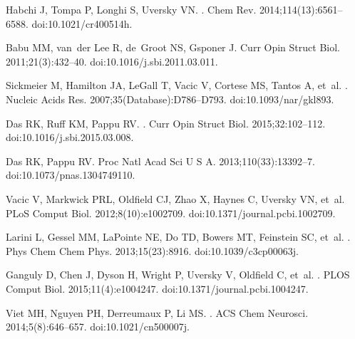 \documentclass[10pt,letterpaper]{article}
\begin{document}
\begin{thebibliography}{10}
Habchi J, Tompa P, Longhi S, Uversky VN.
.
\newblock Chem Rev. 2014;114(13):6561--6588.
\newblock doi:{10.1021/cr400514h}.

Babu MM, van~der Lee R, de~Groot NS, Gsponer J.
\newblock Curr Opin Struct Biol. 2011;21(3):432--40.
\newblock doi:{10.1016/j.sbi.2011.03.011}.

Sickmeier M, Hamilton JA, LeGall T, Vacic V, Cortese MS, Tantos A, et~al.
.
\newblock Nucleic Acids Res. 2007;35(Database):D786--D793.
\newblock doi:{10.1093/nar/gkl893}.

Das RK, Ruff KM, Pappu RV.
.
\newblock Curr Opin Struct Biol. 2015;32:102--112.
\newblock doi:{10.1016/j.sbi.2015.03.008}.

Das RK, Pappu RV.
\newblock Proc Natl Acad Sci U S A. 2013;110(33):13392--7.
\newblock doi:{10.1073/pnas.1304749110}.

Vacic V, Markwick PRL, Oldfield CJ, Zhao X, Haynes C, Uversky VN, et~al.
\newblock PLoS Comput Biol. 2012;8(10):e1002709.
\newblock doi:{10.1371/journal.pcbi.1002709}.

Larini L, Gessel MM, LaPointe NE, Do TD, Bowers MT, Feinstein SC, et~al.
.
\newblock Phys Chem Chem Phys. 2013;15(23):8916.
\newblock doi:{10.1039/c3cp00063j}.

Ganguly D, Chen J, Dyson H, Wright P, Uversky V, Oldfield C, et~al.
.
\newblock PLOS Comput Biol. 2015;11(4):e1004247.
\newblock doi:{10.1371/journal.pcbi.1004247}.

Viet MH, Nguyen PH, Derreumaux P, Li MS.
.
\newblock ACS Chem Neurosci. 2014;5(8):646--657.
\newblock doi:{10.1021/cn500007j}.


\end{thebibliography}
\end{document}
